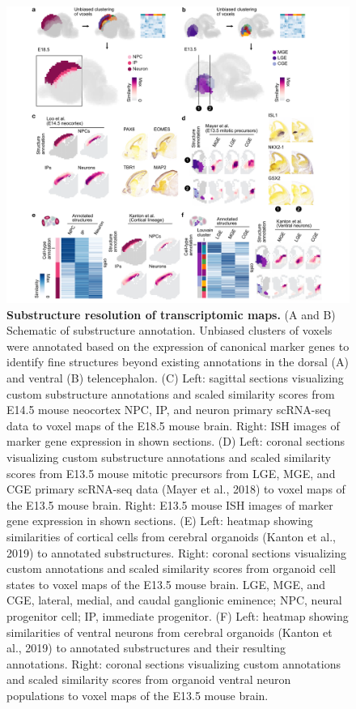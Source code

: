 \begin{figure}[b!]
    \centering
	\includegraphics[width=\textwidth]{figures/voxhunt/Figure_5}
    \caption{\textbf{Substructure resolution of transcriptomic maps.} (A and B) Schematic of substructure annotation. Unbiased clusters of voxels were annotated based on the expression of canonical marker genes to identify fine structures beyond existing annotations in the dorsal (A) and ventral (B) telencephalon. (C) Left: sagittal sections visualizing custom substructure annotations and scaled similarity scores from E14.5 mouse neocortex NPC, IP, and neuron primary scRNA-seq data to voxel maps of the E18.5 mouse brain. Right: ISH images of marker gene expression in shown sections. (D) Left: coronal sections visualizing custom substructure annotations and scaled similarity scores from E13.5 mouse mitotic precursors from LGE, MGE, and CGE primary scRNA-seq data (Mayer et al., 2018) to voxel maps of the E13.5 mouse brain. Right: E13.5 mouse ISH images of marker gene expression in shown sections. (E) Left: heatmap showing similarities of cortical cells from cerebral organoids (Kanton et al., 2019) to annotated substructures. Right: coronal sections visualizing custom annotations and scaled similarity scores from organoid cell states to voxel maps of the E13.5 mouse brain. LGE, MGE, and CGE, lateral, medial, and caudal ganglionic eminence; NPC, neural progenitor cell; IP, immediate progenitor. (F) Left: heatmap showing similarities of ventral neurons from cerebral organoids (Kanton et al., 2019) to annotated substructures and their resulting annotations. Right: coronal sections visualizing custom annotations and scaled similarity scores from organoid ventral neuron populations to voxel maps of the E13.5 mouse brain.}
    \label{fig:vox5}
\end{figure}


